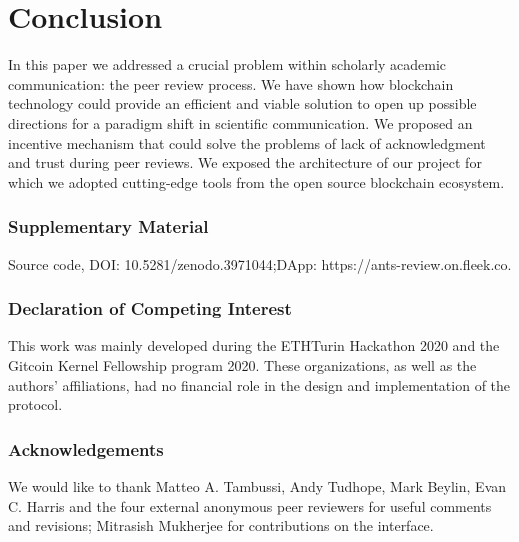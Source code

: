 \documentclass[runningheads]{llncs}
\begin{document}
\small{
\section{Conclusion}
In this paper we addressed a crucial problem within scholarly academic communication: the peer review process. We have shown how blockchain technology could provide an efficient and viable solution to open up possible directions for a paradigm shift in scientific communication. We proposed an incentive mechanism that could solve the problems of lack of acknowledgment and trust during peer reviews. We exposed the architecture of our project for which we adopted cutting-edge tools from the open source blockchain ecosystem.


\subsubsection{Supplementary Material}
Source code, DOI: 10.5281/zenodo.3971044;DApp: https://ants-review.on.fleek.co.

\subsubsection{Declaration of Competing Interest}
This work was mainly developed during the ETHTurin Hackathon 2020 and the Gitcoin Kernel Fellowship program 2020. These organizations, as well as the authors' affiliations, had no financial role in the design and implementation of the protocol.

\subsubsection{Acknowledgements} We would like to thank Matteo A. Tambussi, Andy Tudhope, Mark Beylin, Evan C. Harris and the four external anonymous peer reviewers for useful comments and revisions; Mitrasish Mukherjee for contributions on the interface.}


%
%


\end{document}
